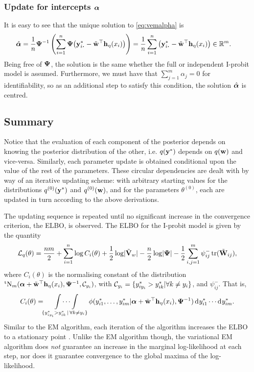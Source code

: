 \subsubsection{Update for intercepts \texorpdfstring{$\balpha$}{$\alpha$}}

It is easy to see that the unique solution to \cref{eq:vemalpha} is
\begin{align*}
  \hat\balpha
  &= \frac{1}{n} \bPsi^{-1} \left( \sum_{i=1}^n \bPsi \big(\by_{i\bigcdot}^* - \tilde\bw^\top\bh_\eta(x_i) \big) \right) 
  =\frac{1}{n} \sum_{i=1}^n \big(\by_{i\bigcdot}^* - \tilde\bw^\top\bh_\eta(x_i) \big) \in \bbR^m.
\end{align*}
Being free of $\bPsi$, the solution is the same whether the full or independent I-probit model is assumed.
Furthermore, we must have that $\sum_{j=1}^m \alpha_j = 0$ for identifiability, so as an additional step to satisfy this condition, the solution $\hat\balpha$ is centred.

\subsection{Summary}

Notice that the evaluation of each component of the posterior depends on knowing the posterior distribution of the other, i.e. $q(\by^*)$ depends on $q(\bw)$ and vice-versa.
Similarly, each parameter update is obtained conditional upon the value of the rest of the parameters.
These circular dependencies are dealt with by way of an iterative updating scheme: with arbitrary starting values for the distributions $q^{(0)}(\by^*)$ and $q^{(0)}(\bw)$, and for the parameters $\theta^{(0)}$, each are updated in turn according to the above derivations.

The updating sequence is repeated until no significant increase in the convergence criterion, the ELBO, is observed.
The ELBO for the I-probit model is given by the quantity
\begin{align}
  \cL_q(\theta) = \half[nm] + \sum_{i=1}^n \log C_i(\theta) + \half\log \abs{\tilde\bV_w} - \half[n]\log\abs{\bPsi} - \half\sum_{i,j=1}^m \psi_{ij}^- \tr(\tilde\bW_{ij}),
\end{align}
where $C_i(\theta)$ is the normalising constant of the distribution $\tN_m(\balpha + \tilde\bw^\top\bh_\eta(x_i),\bPsi^{-1},\cC_{y_i})$, with $\cC_{y_i} = \{y_{iy_i}^* > y_{ik}^* | \forall k \neq y_i \}$, and $\psi_{ij}^{-}$.
That is,
\[
  C_i(\theta) = \idotsint\displaylimits_{\{y_{iy_i}^* > y_{ik}^* \,|\, \forall k \neq y_i \}} \phi(y_{i1}^*, \dots, y_{im}^*|\balpha + \tilde\bw^\top\bh_\eta(x_i), \bPsi^{-1}) \dint y_{i1}^* \cdots \dint y_{im}^*.
\]
Similar to the EM algorithm, each iteration of the algorithm increases the ELBO to a stationary point \citep{blei2017variational}.
Unlike the EM algorithm though, the variational EM algorithm does \emph{not} guarantee an increase in the marginal log-likelihood at each step, nor does it guarantee convergence to the global maxima of the log-likelihood.

